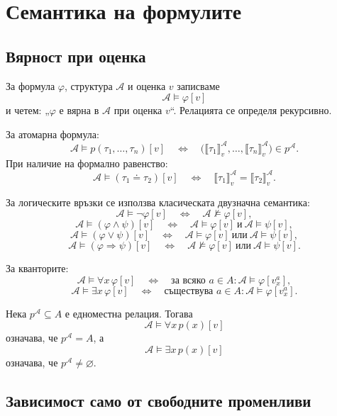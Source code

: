 \section{Семантика на формулите}\label{s:21.3}

\subsection{Вярност при оценка}\label{s:21.3.1}

За формула $\varphi$, структура $\mathcal A$ и оценка $v$ записваме
\[
\mathcal A\models\varphi[v]
\]
и четем: „$\varphi$ е вярна в $\mathcal A$ при оценка $v$“. Релацията се определя рекурсивно.

За атомарна формула:
\[
\mathcal A\models p(\tau_1,\ldots,\tau_n)[v]
\quad\Longleftrightarrow\quad
\bigl(
\llbracket\tau_1\rrbracket^{\mathcal A}_v,\ldots,
\llbracket\tau_n\rrbracket^{\mathcal A}_v
\bigr)\in p^{\mathcal A}.
\]
При наличие на формално равенство:
\[
\mathcal A\models(\tau_1\doteq\tau_2)[v]
\quad\Longleftrightarrow\quad
\llbracket\tau_1\rrbracket^{\mathcal A}_v
=
\llbracket\tau_2\rrbracket^{\mathcal A}_v.
\]

За логическите връзки се използва класическата двузначна семантика:
\[
\mathcal A\models\neg\varphi[v]
\quad\Longleftrightarrow\quad
\mathcal A\not\models\varphi[v],
\]
\[
\mathcal A\models(\varphi\wedge\psi)[v]
\quad\Longleftrightarrow\quad
\mathcal A\models\varphi[v]\ \text{и}\
\mathcal A\models\psi[v],
\]
\[
\mathcal A\models(\varphi\vee\psi)[v]
\quad\Longleftrightarrow\quad
\mathcal A\models\varphi[v]\ \text{или}\
\mathcal A\models\psi[v],
\]
\[
\mathcal A\models(\varphi\Rightarrow\psi)[v]
\quad\Longleftrightarrow\quad
\mathcal A\not\models\varphi[v]\ \text{или}\
\mathcal A\models\psi[v].
\]

За кванторите:
\[
\mathcal A\models\forall x\,\varphi[v]
\quad\Longleftrightarrow\quad
\text{за всяко }a\in A:
\mathcal A\models\varphi[v_x^a],
\]
\[
\mathcal A\models\exists x\,\varphi[v]
\quad\Longleftrightarrow\quad
\text{съществува }a\in A:
\mathcal A\models\varphi[v_x^a].
\]

\begin{example}
Нека $p^{\mathcal A}\subseteq A$ е едноместна релация. Тогава
\[
\mathcal A\models\forall x\,p(x)[v]
\]
означава, че $p^{\mathcal A}=A$, а
\[
\mathcal A\models\exists x\,p(x)[v]
\]
означава, че $p^{\mathcal A}\ne\varnothing$.
\end{example}

\subsection{Зависимост само от свободните променливи}\label{s:21.3.2}

